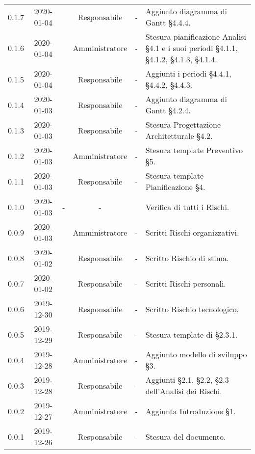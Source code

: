 {\begin{longtable}{ c c  C{2.3cm} c C{3cm} C{3.2cm}}
0.1.7 & 2020-01-04 & \SE{} & Responsabile & - & Aggiunto diagramma di Gantt §4.4.4. \\
0.1.6 & 2020-01-04 & \LD{} & Amministratore & - & Stesura pianificazione Analisi §4.1 e i suoi periodi §4.1.1, §4.1.2, §4.1.3, §4.1.4. \\
0.1.5 & 2020-01-04 & \SE{} & Responsabile & - & Aggiunti i periodi §4.4.1, §4.4.2, §4.4.3. \\
0.1.4 & 2020-01-03 & \SE{} & Responsabile & - & Aggiunto diagramma di Gantt §4.2.4. \\
0.1.3 & 2020-01-03 & \SE{} & Responsabile & - & Stesura Progettazione Architetturale §4.2.\\
0.1.2 & 2020-01-03 & \LD{} & Amministratore & - & Stesura template Preventivo §5. \\
0.1.1 & 2020-01-03 & \SE{} & Responsabile & - & Stesura template Pianificazione §4. \\
0.1.0 & 2020-01-03 & - & - & \AT{} & Verifica di tutti i Rischi. \\
0.0.9 & 2020-01-03 & \LD{} & Amministratore & - & Scritti Rischi organizzativi. \\
0.0.8 & 2020-01-02 & \SE{} & Responsabile & - & Scritto Rischio di stima. \\
0.0.7 & 2020-01-02 & \SE{} & Responsabile & - & Scritti Rischi personali. \\
0.0.6 & 2019-12-30 & \SE{} & Responsabile & - & Scritto Rischio tecnologico. \\
0.0.5 & 2019-12-29 & \SE{} & Responsabile & - & Stesura template di §2.3.1. \\
0.0.4 & 2019-12-28 & \LD{} & Amministratore & - & Aggiunto modello di sviluppo §3. \\
0.0.3 & 2019-12-28 & \SE{} & Responsabile & - & Aggiunti §2.1, §2.2, §2.3 dell'Analisi dei Rischi. \\
0.0.2 & 2019-12-27 & \LD{} & Amministratore & - & Aggiunta Introduzione §1. \\
0.0.1 & 2019-12-26 & \SE{} & Responsabile & - & Stesura del documento. \\
		
\end{longtable}
}